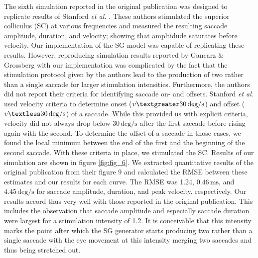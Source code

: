 \documentclass[10pt,a4paper,onecolumn]{article}
\begin{document}
\pagebreak
The sixth simulation reported in the original publication was designed
to replicate results of Stanford \textit{et al.}
\autocite{Stanford1996}. These authors stimulated the superior
colliculus (SC) at various frequencies and measured the resulting
saccade amplitude, duration, and velocity; showing that ampltidude
saturates before velocity. Our implementation of the SG model was
capable of replicating these results. However, reproducing simulation
results reported by Gancarz \& Grossberg \autocite{Gancarz1998} with our
implementation was complicated by the fact that the stimulation protocol
given by the authors lead to the production of two rather than a single
saccade for larger stimulation intensities. Furthermore, the authors did
not report their criteria for identifying saccade on- and offsets.
Stanford \textit{et al.} \autocite{Stanford1996} used velocity criteria
to determine onset (\(v\textgreater30\,\mathrm{deg/s}\)) and offset
(\(v\textless30\,\mathrm{deg/s}\)) of a saccade. While this provided us
with explicit criteria, velocity did not always drop below
\(30\,\mathrm{deg/s}\) after the first saccade before rising again with
the second. To determine the offset of a saccade in those cases, we
found the local minimum between the end of the first and the beginning
of the second saccade. With these criteria in place, we stimulated the
SC. Results of our simulation are shown in figure \ref{fig:fig_6}. We
extracted quantitative results of the original publication from their
figure 9 and calculated the RMSE between these estimates and our results
for each curve. The RMSE was 1.24\textdegree, \(0.46\,\mathrm{ms}\), and
\(4.45\,\mathrm{deg/s}\) for saccade amplitude, duration, and peak
velocity, respectively. Our results accord thus very well with those
reported in the original publication. This includes the observation that
saccade amplitude and especially saccade duration were largest for a
stimulation intensity of 1.2. It is conceivable that this intensity
marks the point after which the SG generator starts producing two rather
than a single saccade with the eye movement at this intensity merging
two saccades and thus being stretched out.
\end{document}
